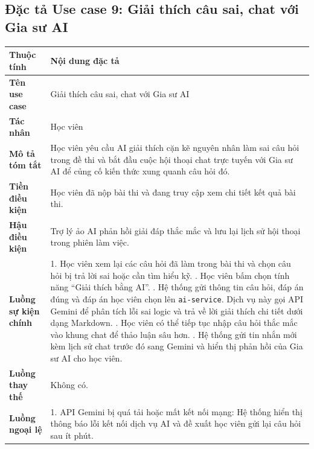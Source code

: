 \documentclass[../DoAn.tex]{subfiles}
\begin{document}
\newpage
\subsection{Đặc tả Use case 9: Giải thích câu sai, chat với Gia sư AI}
\nopagebreak
\begingroup
\centering
\fontsize{11pt}{14pt}\selectfont
\begin{tabular}{|p{3.2cm}|p{10.8cm}|}
\hline
\textbf{Thuộc tính} & \textbf{Nội dung đặc tả} \\ \hline
\textbf{Tên use case} & Giải thích câu sai, chat với Gia sư AI \\ \hline
\textbf{Tác nhân} & Học viên \\ \hline
\textbf{Mô tả tóm tắt} & Học viên yêu cầu AI giải thích cặn kẽ nguyên nhân làm sai câu hỏi trong đề thi và bắt đầu cuộc hội thoại chat trực tuyến với Gia sư AI để củng cố kiến thức xung quanh câu hỏi đó. \\ \hline
\textbf{Tiền điều kiện} & Học viên đã nộp bài thi và đang truy cập xem chi tiết kết quả bài thi. \\ \hline
\textbf{Hậu điều kiện} & Trợ lý ảo AI phản hồi giải đáp thắc mắc và lưu lại lịch sử hội thoại trong phiên làm việc. \\ \hline
\textbf{Luồng sự kiện chính} & 
1. Học viên xem lại các câu hỏi đã làm trong bài thi và chọn câu hỏi bị trả lời sai hoặc cần tìm hiểu kỹ. \newline
2. Học viên bấm chọn tính năng ``Giải thích bằng AI''. \newline
3. Hệ thống gửi thông tin câu hỏi, đáp án đúng và đáp án học viên chọn lên \texttt{ai-service}. Dịch vụ này gọi API Gemini để phân tích lỗi sai logic và trả về lời giải thích chi tiết dưới dạng Markdown. \newline
4. Học viên có thể tiếp tục nhập câu hỏi thắc mắc vào khung chat để thảo luận sâu hơn. \newline
5. Hệ thống gửi tin nhắn mới kèm lịch sử chat trước đó sang Gemini và hiển thị phản hồi của Gia sư AI cho học viên. \\ \hline
\textbf{Luồng thay thế} & Không có. \\ \hline
\textbf{Luồng ngoại lệ} & 
1. API Gemini bị quá tải hoặc mất kết nối mạng: Hệ thống hiển thị thông báo lỗi kết nối dịch vụ AI và đề xuất học viên gửi lại câu hỏi sau ít phút. \\ \hline
\end{tabular}
\label{table:uc_ai_explain_chat}
\par
\endgroup
\end{document}
